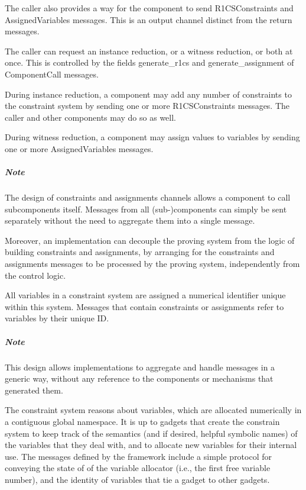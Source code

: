 	The caller also provides a way for the component to send 
	R1CSConstraints and AssignedVariables messages.
	This is an output channel distinct from the return messages.

	The caller can request an instance reduction, or a witness reduction, or both at once.
	This is controlled by the fields generate\_r1cs and generate\_assignment of ComponentCall messages.

	During instance reduction,
	a component may add any number of constraints to the constraint system
	by sending one or more R1CSConstraints messages.
	The caller and other components may do so as well.

	During witness reduction,
	a component may assign values to variables
	by sending one or more AssignedVariables messages.

	\subparagraph{Note}
	The design of constraints and assignments channels
	allows a component to call subcomponents itself.
	Messages from all (sub-)components can simply be sent separately
	without the need to aggregate them into a single message.
	
	Moreover, an implementation can decouple the proving system
	from the logic of building constraints and assignments,
	by arranging for the constraints and assignments messages
	to be processed by the proving system, independently from the control logic.


	All variables in a constraint system are assigned a numerical identifier
	unique within this system.
	Messages that contain constraints or assignments refer to variables by their
	unique ID.

	\subparagraph{Note}
	This design allows implementations to aggregate and handle messages in a generic way,
	without any	reference to the components or mechanisms that generated them.


	The constraint system reasons about variables, which are allocated numerically in a contiguous global namespace. It is up to gadgets that create the constrain system to keep track of the semantics (and if desired, helpful symbolic names) of the variables that they deal with, and to allocate new variables for their internal use. The messages defined by the framework include a simple protocol for conveying the state of of the variable allocator (i.e., the first free variable number), and the identity of variables that tie a gadget to other gadgets.

